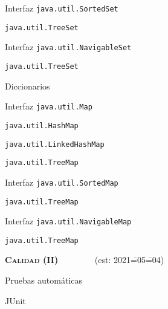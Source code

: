 \begin{longenum}
\begin{longenum}
\begin{longenum}
\begin{longenum}
            \end{longenum}
            \item Interfaz \texttt{java.util.SortedSet}
            \begin{longenum}
                \item \texttt{java.util.TreeSet}
            \end{longenum}
            \item Interfaz \texttt{java.util.NavigableSet}
            \begin{longenum}
                \item \texttt{java.util.TreeSet}
            \end{longenum}
        \end{longenum}
        \item Diccionarios
        \begin{longenum}
            \item Interfaz \texttt{java.util.Map}
            \begin{longenum}
                \item \texttt{java.util.HashMap}
                \item \texttt{java.util.LinkedHashMap}
                \item \texttt{java.util.TreeMap}
            \end{longenum}
            \item Interfaz \texttt{java.util.SortedMap}
            \begin{longenum}
                \item \texttt{java.util.TreeMap}
            \end{longenum}
            \item Interfaz \texttt{java.util.NavigableMap}
            \begin{longenum}
                \item \texttt{java.util.TreeMap}
            \end{longenum}
        \end{longenum}
    \end{longenum}
    \item \textbf{\textsc{Calidad (II)}} \ \ \ \ \ \ \ \ (est: 2021\==05\==04)
    \begin{longenum}
        \item Pruebas automáticas
        \begin{longenum}
            \item JUnit

\end{longenum}
\end{longenum}
\end{longenum}
